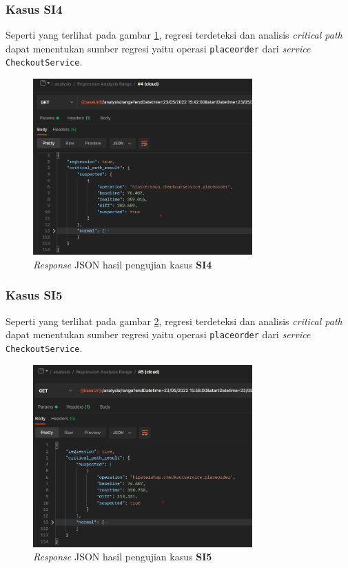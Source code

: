 \subsubsection{Kasus SI4}
Seperti yang terlihat pada gambar \ref{result_json_4}, regresi terdeteksi dan analisis \textit{critical path} dapat menentukan sumber regresi yaitu operasi \texttt{placeorder} dari \textit{service} \texttt{CheckoutService}.
\begin{figure}[!htb]
	\centering
	\includegraphics[width=0.75\textwidth]{resources/ch4/json/4.png}
	\caption{\textit{Response} JSON hasil pengujian kasus \textbf{SI4}}
	\label{result_json_4}
\end{figure}

\pagebreak

\subsubsection{Kasus SI5}
Seperti yang terlihat pada gambar \ref{result_json_5}, regresi terdeteksi dan analisis \textit{critical path} dapat menentukan sumber regresi yaitu operasi \texttt{placeorder} dari \textit{service} \texttt{CheckoutService}.
\begin{figure}[!htb]
	\centering
	\includegraphics[width=0.75\textwidth]{resources/ch4/json/5.png}
	\caption{\textit{Response} JSON hasil pengujian kasus \textbf{SI5}}
	\label{result_json_5}
\end{figure}

